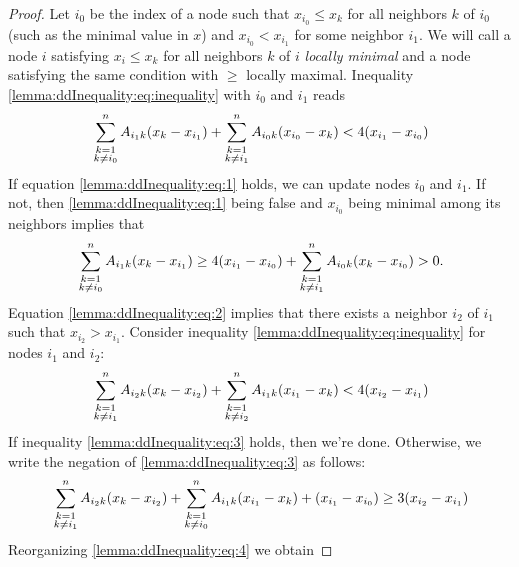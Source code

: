 \documentclass{article}
\theoremstyle{remark}
\begin{document}
\begin{proof}
	Let $i_0$ be the index of a node such that $x_{i_0}\leq x_{k}$ for all neighbors $k$ of $i_0$ (such as the minimal value in $x$) and $x_{i_0} < x_{i_1}$ for some neighbor $i_1$. We will call a node $i$ satisfying $x_{i}\leq x_{k}$ for all neighbors $k$ of $i$ \textit{locally minimal} and a node satisfying the same condition with $\geq$ locally maximal. Inequality \eqref{lemma:ddInequality:eq:inequality} with $i_0$ and $i_1$ reads
	\begin{equation}{\label{lemma:ddInequality:eq:1}}
		\sum_{\substack{k=1\\k\neq i_0}}^nA_{i_1k}(x_k-x_{i_1}) + \sum_{\substack{k=1\\k\neq i_1}}^nA_{i_0k}(x_{i_0}-x_k) < 4(x_{i_1}-x_{i_0})
	\end{equation}
	If equation \eqref{lemma:ddInequality:eq:1} holds, we can update nodes $i_0$ and $i_1$. If not, then \eqref{lemma:ddInequality:eq:1} being false and $x_{i_0}$ being minimal among its neighbors implies that 
	\begin{equation}{\label{lemma:ddInequality:eq:2}}
		\sum_{\substack{k=1\\k\neq i_0}}^nA_{i_1k}(x_k-x_{i_1}) \geq 4(x_{i_1}-x_{i_0}) + \sum_{\substack{k=1\\k\neq i_1}}^nA_{i_0k}(x_k-x_{i_0})>0.
	\end{equation}
	Equation \eqref{lemma:ddInequality:eq:2} implies that there exists a neighbor $i_2$ of $i_1$ such that $x_{i_2}>x_{i_1}$. Consider inequality \eqref{lemma:ddInequality:eq:inequality} for nodes $i_1$ and $i_2$:
	\begin{equation}{\label{lemma:ddInequality:eq:3}}
		\sum_{\substack{k=1\\k\neq i_1}}^nA_{i_2k}(x_k-x_{i_2}) + \sum_{\substack{k=1\\k\neq i_2}}^nA_{i_1k}(x_{i_1}-x_k) < 4(x_{i_2}-x_{i_1})
	\end{equation}
	If inequality \eqref{lemma:ddInequality:eq:3} holds, then we're done.  Otherwise, we write the negation of \eqref{lemma:ddInequality:eq:3} as follows:
	\begin{equation}{\label{lemma:ddInequality:eq:4}}
		\sum_{\substack{k=1\\k\neq i_1}}^nA_{i_2k}(x_k-x_{i_2}) + \sum_{\substack{k=1\\k\neq i_0}}^nA_{i_1k}(x_{i_1}-x_k) + (x_{i_1}-x_{i_0}) \geq 3(x_{i_2}-x_{i_1})
	\end{equation}
	Reorganizing \eqref{lemma:ddInequality:eq:4} we obtain

\end{proof}
\end{document}
